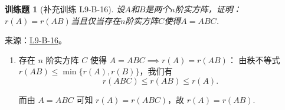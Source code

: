 \documentclass[UTF8,12pt,a4paper,fontset=fandol]{ctexart}
\newtheorem{exercise}{训练题}[section]
\begin{document}
\begin{exercise}[补充训练 L9-B-16]\label{prob:L9-B-16}
设$A$和$B$是两个$n$阶实方阵，证明：$r(A)=r(AB)$当且仅当存在$n$阶实方阵$C$使得$A=ABC$.
\end{exercise}
\noindent 来源：\href{https://github.com/yhwu-is/Linear-Algebra-Left-Undone/blob/new/%E8%AE%B2%E4%B9%89/%E4%B8%93%E9%A2%98/9%20%E7%9F%A9%E9%98%B5%E8%BF%90%E7%AE%97%E8%BF%9B%E9%98%B6.tex}{L9-B-16}。
\begin{solve}
\begin{enumerate}
                \item 存在 $n$ 阶实方阵 $C$ 使得 $A = ABC \implies r(A) = r(AB)$：
                    由秩不等式 $r(AB) \leqslant \min\{r(A), r(B)\}$，我们有
                    \[
                        r(ABC) \leqslant r(AB) \leqslant r(A).
                    \]

                    而由 $A=ABC$ 可知 $r(A) = r(ABC)$，故 $r(A) = r(AB)$.


\end{enumerate}
\end{solve}
\end{document}
